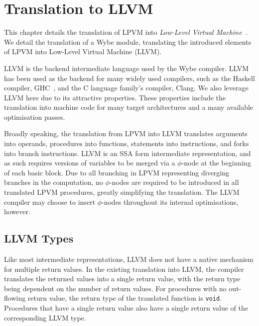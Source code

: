 \clearpage

\def\chaptertitle{Translation to LLVM}

\lhead{\emph{\chaptertitle}}

\chapter{\chaptertitle}
\label{ch:llvm-conversions}

This chapter details the translation of LPVM into \textit{Low-Level Virtual Machine}~\cite{lattner2004llvm}. We detail the translation of a Wybe module, translating the introduced elements of LPVM into Low-Level Virtual Machine (LLVM).

LLVM is the backend intermediate language used by the Wybe compiler. LLVM has been used as the backend for many widely used compilers, such as the Haskell compiler, GHC~\cite{terei2010llvm}, and the C language family's compiler, Clang. We also leverage LLVM here due to its attractive properties. These properties include the translation into machine code for many target architectures and a many available optimisation passes.

Broadly speaking, the translation from LPVM into LLVM translates arguments into operands, procedures into functions, statements into instructions, and forks into branch instructions. LLVM is an SSA form intermediate representation, and as such requires versions of variables to be merged via a $\phi$-node at the beginning of each basic block. Due to all branching in LPVM representing diverging branches in the computation, no $\phi$-nodes are required to be introduced in all translated LPVM procedures, greatly simplifying the translation. The LLVM compiler may choose to insert $\phi$-nodes throughout its internal optimisations, however.

\section{LLVM Types}
\label{sec:llvm-types}

Like most intermediate representations, LLVM does not have a native mechanism for multiple return values. In the existing translation into LLVM, the compiler translates the returned values into a single return value, with the return type being dependent on the number of return values. For procedures with no out-flowing return value, the return type of the translated function is \texttt{void}. Procedures that have a single return value also have a single return value of the corresponding LLVM type. 


